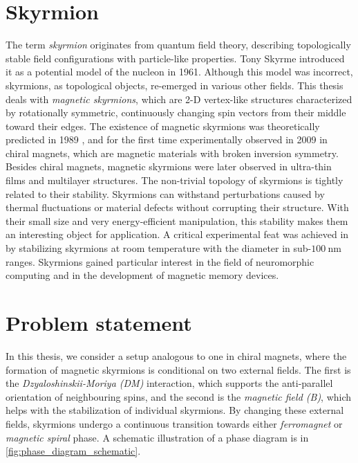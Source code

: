 
\section*{Skyrmion}

The term \emph{skyrmion} originates from quantum field theory, describing topologically stable field configurations with particle-like properties. Tony Skyrme introduced it as a potential model of the nucleon in 1961. Although this model was incorrect, skyrmions, as topological objects, re-emerged in various other fields. This thesis deals with \emph{magnetic skyrmions}, which are 2-D vertex-like structures characterized by rotationally symmetric, continuously changing spin vectors from their middle toward their edges. The existence of magnetic skyrmions was theoretically predicted in 1989 \cite{bogdanov1989thermodynamically}, and for the first time experimentally observed in 2009 \cite{muhlbauer2009skyrmion} in chiral magnets, which are magnetic materials with broken inversion symmetry. Besides chiral magnets, magnetic skyrmions were later observed in ultra-thin films and multilayer structures. The non-trivial topology of skyrmions is tightly related to their stability. Skyrmions can withstand perturbations caused by thermal fluctuations or material defects without corrupting their structure. With their small size and very energy-efficient manipulation, this stability makes them an interesting object for application. A critical experimental feat was achieved in \cite{moreau2016additive} by stabilizing skyrmions at room temperature with the diameter in sub-$\SI{100}{\nano\meter}$ ranges. Skyrmions gained particular interest in the field of neuromorphic computing \cite{chen2020nanoscale} and in the development of magnetic memory devices.

\section*{Problem statement}

In this thesis, we consider a setup analogous to one in chiral magnets, where the formation of magnetic skyrmions is conditional on two external fields. The first is the \emph{Dzyaloshinskii-Moriya (DM)} interaction, which supports the anti-parallel orientation of neighbouring spins, and the second is the \emph{magnetic field (B)}, which helps with the stabilization of individual skyrmions. By changing these external fields, skyrmions undergo a continuous transition towards either \emph{ferromagnet} or \emph{magnetic spiral} phase. A schematic illustration of a phase diagram is in \ref{fig:phase_diagram_schematic}.

